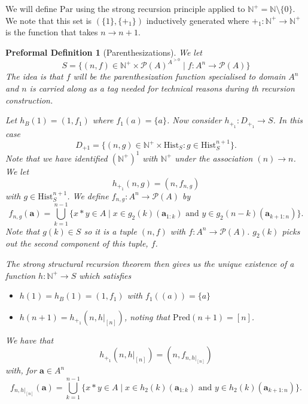 \documentclass[oneside, 12pt]{book}
\theoremstyle{break}
\newtheorem{preformal definition}[definition]{Preformal Definition}
\newtheorem{preformal theorem}[theorem]{Preformal Theorem}
\newcommand{\bv}[1]{\boldsymbol{#1}}
\newcommand{\mc}[1]{\mathcal{#1}}
\newcommand{\N}[0]{\mathbb{N}}
\begin{document}
			We will define $\text{Par}$ using the strong recursion principle applied to $\N^+ = \N \setminus \{0\}$.
			We note that this set is $(\{1\}, \{+_1\})$ inductively generated where $+_1: \N^+ \to \N^+$ is the function that takes $n \to n+1$.
			
			\begin{preformal definition}[Parenthesizations]
				We let
				\begin{equation*}
					S = \{(n, f) \in \N^+\times \mc{P}(A)^{A^{>0}} \mid f: A^n \to \mc{P}(A)\}
				\end{equation*}
				The idea is that $f$ will be the parenthesization function specialised to domain $A^n$ and $n$ is carried along as a tag needed for technical reasons during th recursion construction.
				
				Let $h_B(1) = (1, f_1)$ where $f_1(a) = \{a\}$.
				Now consider $h_{+_1}: D_{+_1} \to S$.
				In this case
				\begin{equation*}
					D_{+1} = \{(n, g) \in \N^+ \times \text{Hist}_S: g \in \text{Hist}_S^{n+1}\}.
				\end{equation*}
				Note that we have identified $(\N^+)^1$ with $\N^+$ under the association $(n) \to n$.
				We let
				\begin{equation*}
					h_{+_1}(n, g) = (n, f_{n, g})
				\end{equation*}
				with $g \in \text{Hist}_S^{n+1}$.
				We define $f_{n, g}: A^n \to \mc{P}(A)$ by
				\begin{equation*}
					f_{n, g}(\bv{a}) = \bigcup_{k=1}^{n-1} \{x\ast y \in A \mid x\in g_2(k)(\bv{a}_{1:k}) \text{ and } y \in g_2(n-k)(\bv{a}_{k+1:n})\}.
				\end{equation*}
				Note that $g(k)\in S$ so it is a tuple $(n, f)$ with $f:A^n \to \mc{P}(A)$.
				$g_2(k)$ picks out the second component of this tuple, $f$.
				
				The strong structural recursion theorem then gives us the unique existence of a function $h: \N^+ \to S$ which satisfies
				\begin{itemize}
					\item{$h(1) = h_B(1) = (1, f_1)$ with $f_1((a)) = \{a\}$}
					\item{$h(n+1) = h_{+_1}(n, h|_{[n]})$, noting that $\text{Pred}(n+1) = [n]$.}
				\end{itemize}
				We have that 
				\begin{equation*}
					h_{+_1}(n, h|_{[n]}) = (n, f_{n, h|_{[n]}})
				\end{equation*}
				with, for $\bv{a} \in A^n$
				\begin{equation*}
					f_{n, h|_{[n]}}(\bv{a}) = \bigcup_{k=1}^{n-1} \{x\ast y\in A \mid x\in h_2(k)(\bv{a}_{1:k})\text{ and } y \in h_2(k)(\bv{a}_{k+1:n})\}.
				\end{equation*}
				

\end{preformal definition}
\end{document}
